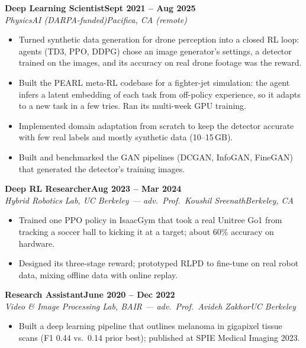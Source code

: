 \documentclass[10pt]{article}
\newcommand{\role}[4]{\par\vspace{5pt}\textbf{#1}\hfill\textbf{#2}\\\textit{#3}\hfill\textit{#4}}
\begin{document}
\role{Deep Learning Scientist}{Sept 2021 -- Aug 2025}{PhysicsAI (DARPA-funded)}{Pacifica, CA (remote)}
\begin{itemize}
\item Turned synthetic data generation for drone perception into a closed RL loop: agents (TD3, PPO, DDPG) chose an image generator's settings, a detector trained on the images, and its accuracy on real drone footage was the reward.
\item Built the PEARL meta-RL codebase for a fighter-jet simulation: the agent infers a latent embedding of each task from off-policy experience, so it adapts to a new task in a few tries. Ran its multi-week GPU training.
\item Implemented domain adaptation from scratch to keep the detector accurate with few real labels and mostly synthetic data (10--15\,GB).
\item Built and benchmarked the GAN pipelines (DCGAN, InfoGAN, FineGAN) that generated the detector's training images.
\end{itemize}

\role{Deep RL Researcher}{Aug 2023 -- Mar 2024}{Hybrid Robotics Lab, UC Berkeley --- adv.\ Prof.\ Koushil Sreenath}{Berkeley, CA}
\begin{itemize}
\item Trained one PPO policy in IsaacGym that took a real Unitree Go1 from tracking a soccer ball to kicking it at a target; about 60\% accuracy on hardware.
\item Designed its three-stage reward; prototyped RLPD to fine-tune on real robot data, mixing offline data with online replay.
\end{itemize}

\role{Research Assistant}{June 2020 -- Dec 2022}{Video \& Image Processing Lab, BAIR --- adv.\ Prof.\ Avideh Zakhor}{UC Berkeley}
\begin{itemize}
\item Built a deep learning pipeline that outlines melanoma in gigapixel tissue scans (F1 0.44 vs.\ 0.14 prior best); published at SPIE Medical Imaging 2023.
\end{itemize}
\end{document}
